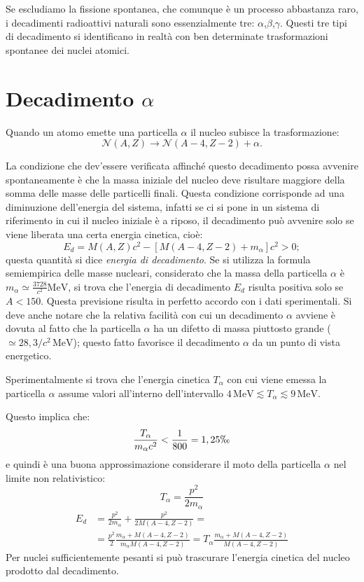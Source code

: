 Se escludiamo la fissione spontanea, che comunque è un processo abbastanza 
raro, i decadimenti radioattivi naturali sono essenzialmente tre:
$\alpha$,$\beta$,$\gamma$. Questi tre tipi di decadimento si identificano in 
realtà con ben determinate trasformazioni spontanee dei nuclei atomici.

\section{Decadimento $\alpha$}

Quando un atomo emette una particella $\alpha$ il nucleo subisce la
trasformazione:
\begin{equation}
\mathcal{N}(A,Z)\rightarrow\mathcal{N}(A-4,Z-2)+\alpha.
\end{equation}

La condizione che dev'essere verificata affinché questo decadimento possa
avvenire spontaneamente è che la massa iniziale del nucleo deve risultare
maggiore della somma delle masse delle particelli finali. Questa condizione
corrisponde ad una diminuzione dell'energia del sistema, infatti se ci si pone
in un sistema di riferimento in cui il nucleo iniziale è a riposo, il
decadimento può avvenire solo se viene liberata una certa energia cinetica,
cioè:
\begin{equation}
E_d=M(A,Z)c^2-[M(A-4,Z-2)+m_{\alpha}]c^2>0;
\end{equation}
questa quantità  si dice \textit{energia di decadimento}. Se si utilizza la
formula semiempirica delle masse nucleari, considerato che la massa della
particella $\alpha$ è 
$m_{\alpha}\simeq\frac{3728}{c^2}\si{\mega\electronvolt}$,
si trova che l'energia di decadimento $E_d$ risulta positiva solo se $A<150$.
Questa previsione risulta in perfetto accordo con i dati sperimentali. Si deve
anche notare che la relativa facilità con cui un decadimento $\alpha$ avviene 
è
dovuta al fatto che la particella $\alpha$ ha un difetto di massa piuttosto
grande ($\simeq28,3/c^2\,\si{\mega\electronvolt}$); questo fatto favorisce il
decadimento $\alpha$ da un punto di vista energetico.

Sperimentalmente si trova che l'energia cinetica $T_{\alpha}$ con cui viene
emessa la particella $\alpha$ assume valori all'interno dell'intervallo
$4\,\si{\mega\electronvolt}\lesssim T_{\alpha}\lesssim
9\,\si{\mega\electronvolt}$.

Questo implica che:
\[
\frac{T_{\alpha}}{m_{\alpha}c^2}<\frac{1}{800}=1,25\permil
\]
e quindi è una buona approssimazione considerare il moto della particella
$\alpha$ nel limite non relativistico:
\[
T_{\alpha}=\frac{p^2}{2m_{\alpha}}
\]
\begin{equation}
  \begin{split}
    E_d&=\frac{p^2}{2m_{\alpha}}+\frac{p^2}{2M(A-4,Z-2)}=\\ 
    &=\frac{p^2}{2}\frac{m_{\alpha}+M(A-4,Z-2)}{m_{\alpha}M(A-4,Z-2)}=
    T_{\alpha} \frac{m_{\alpha}+M(A-4,Z-2)}{M(A-4,Z-2)}
  \end{split}
\end{equation}
Per nuclei sufficientemente pesanti si può trascurare l'energia cinetica del
nucleo prodotto dal decadimento.


